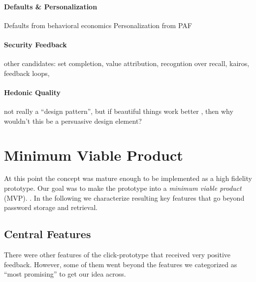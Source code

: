 \paragraph{Defaults \& Personalization}
Defaults from behavioral economics
Personalization from PAF


\paragraph{Security Feedback}
other candidates: set completion, value attribution, recogntion over recall, kairos, feedback loops, 

\paragraph{Hedonic Quality}
not really a ``design pattern'', but if beautiful things work better \cite{Tractinsky1997, Fogg2001WhatMakesSitesCredible}, then why wouldn't this be a persuasive design element?


\section{Minimum Viable Product}
At this point the concept was mature enough to be implemented as a high fidelity prototype. Our goal was to make the prototype into a \textit{minimum viable product} (MVP). . In the following we characterize resulting key features that go beyond password storage and retrieval. 

\subsection{Central Features}



There were other features of the click-prototype that received very positive feedback. However, some of them went beyond the features we categorized as ``most promising'' to get our idea across. 

